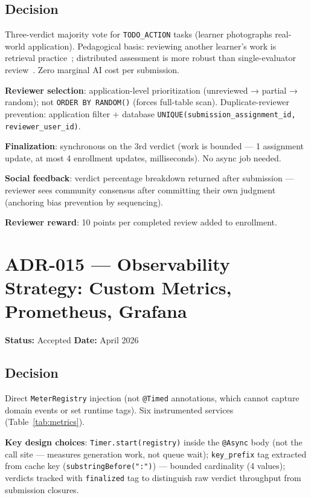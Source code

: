 \subsection*{Decision}
Three-verdict majority vote for \texttt{TODO\_ACTION} tasks (learner photographs real-world application). Pedagogical basis: reviewing another learner's work is retrieval practice~\cite{roediger2011retrieval}; distributed assessment is more robust than single-evaluator review~\cite{reily2010two}. Zero marginal AI cost per submission.

\textbf{Reviewer selection}: application-level prioritization (unreviewed → partial → random); not \texttt{ORDER BY RANDOM()} (forces full-table scan). Duplicate-reviewer prevention: application filter + database \texttt{UNIQUE(submission\_assignment\_id, reviewer\_user\_id)}.

\textbf{Finalization}: synchronous on the 3rd verdict (work is bounded — 1 assignment update, at most 4 enrollment updates, milliseconds). No async job needed.

\textbf{Social feedback}: verdict percentage breakdown returned after submission — reviewer sees community consensus after committing their own judgment (anchoring bias prevention by sequencing).

\textbf{Reviewer reward}: 10 points per completed review added to enrollment.

\section{ADR-015 — Observability Strategy: Custom Metrics, Prometheus, Grafana}
\label{adr:015}
\textbf{Status:} Accepted \quad \textbf{Date:} April 2026

\subsection*{Decision}
Direct \texttt{MeterRegistry} injection (not \texttt{@Timed} annotations, which cannot capture domain events or set runtime tags). Six instrumented services (Table~\ref{tab:metrics}).

\textbf{Key design choices}: \texttt{Timer.start(registry)} inside the \texttt{@Async} body (not the call site — measures generation work, not queue wait); \texttt{key\_prefix} tag extracted from cache key (\texttt{substringBefore(":")}) — bounded cardinality (4 values); verdicts tracked with \texttt{finalized} tag to distinguish raw verdict throughput from submission closures.

